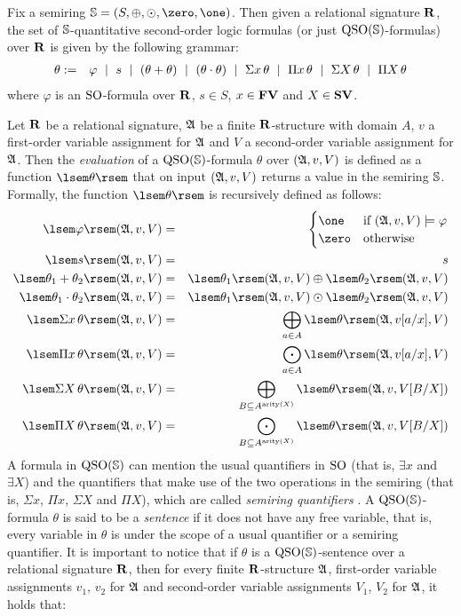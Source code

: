 Fix a semiring $\SR = (S, \adds, \mults, \zero, \one)$. Then given a relational signature $\mathbf{R}$, the set of $\mathbb{S}$-quantitative second-order logic formulas (or just ${\rm QSO}(\mathbb{S})$-formulas) over $\mathbf{R}$ is given by the following grammar:
\begin{eqnarray}
\label{eq-def-qso}
  \theta & := & \varphi \ \mid \ s \ \mid \ (\theta + \theta) \ \mid\ (\theta \cdot \theta) \ \mid \ \Sigma{x}\, \theta \ \mid \ \Pi{x}\, \theta \ \mid \ \Sigma{X}\, \theta \ \mid \ \Pi{X}\, \theta 
\end{eqnarray}
where $\varphi$ is an ${\rm SO}$-formula over $\mathbf{R}$, $s \in S$, $x \in \mathbf{FV}$ and $X \in \mathbf{SV}$.

Let $\mathbf{R}$ be a relational signature, $\mathfrak{A}$ be a finite $\mathbf{R}$-structure with domain $A$, $v$ a first-order variable assignment for $\mathfrak{A}$ and $V$ a second-order variable assignment for $\mathfrak{A}$. Then the \emph{evaluation} of a ${\rm QSO}(\mathbb{S})$-formula $\theta$ over $(\mathfrak{A}, v, V)$ is defined as a function $\sem{\theta}$ that on input $(\mathfrak{A}, v, V)$ returns a value in the semiring $\mathbb{S}$. Formally, the function $\sem{\theta}$ is recursively defined as follows:
\begin{eqnarray*}
\sem{\varphi}(\A, v, V) & = & 
\begin{cases}
\one & \mbox{if } (\A, v, V) \models \varphi \\
\zero & \mbox{otherwise}
\end{cases}\\
\sem{s}(\A, v, V) & = & s \\
\sem{\theta_1 \add \theta_2}(\A, v, V) & = & \sem{\theta_1}(\A, v, V) \adds \sem{\theta_2}(\A, v, V)\\
\sem{\theta_1 \mult \theta_2}(\A, v, V) & = & \sem{\theta_1}(\A, v, V) \mults \sem{\theta_2}(\A, v, V)\\ 
\sem{\sa{x} \theta}(\A, v, V) & = & \bigadds_{a \in A} \sem{\theta}(\A,v[a/x],V)\\
\sem{\pa{x} \theta}(\A, v, V) & = & \bigmults_{a \in A} \sem{\theta}(\A,v[a/x],V)\\
\sem{\sa{X} \theta}(\A, v, V) & = & \bigadds_{B \subseteq A^{\arity(X)}} \sem{\theta}(\A, v, V[B/X])\\
\sem{\pa{X} \theta}(\A, v, V) & = & \bigmults_{B \subseteq A^{\arity(X)}} \sem{\theta}(\A, v, V[B/X])
\end{eqnarray*}
A formula in ${\rm QSO}(\mathbb{S})$ can mention the usual quantifiers in ${\rm SO}$ (that is, $\exists x$ and $\exists X$) and the quantifiers that make use of the two operations in the semiring (that is, $\Sigma x$, $\Pi x$, $\Sigma X$ and $\Pi X$), which are called {\em semiring quantifiers} . A ${\rm QSO}(\mathbb{S})$-formula $\theta$ is said to be a \emph{sentence} if it does not have any free variable, that is, every variable in $\theta$ is under the scope of a usual quantifier or a semiring quantifier. It is important to notice that if $\theta$ is a ${\rm QSO}(\mathbb{S})$-sentence over a relational signature $\mathbf{R}$, then for every finite $\mathbf{R}$-structure $\mathfrak{A}$, first-order variable assignments $v_1$, $v_2$ for $\mathfrak{A}$ and second-order variable assignments $V_1$, $V_2$ for $\mathfrak{A}$, it holds that:
